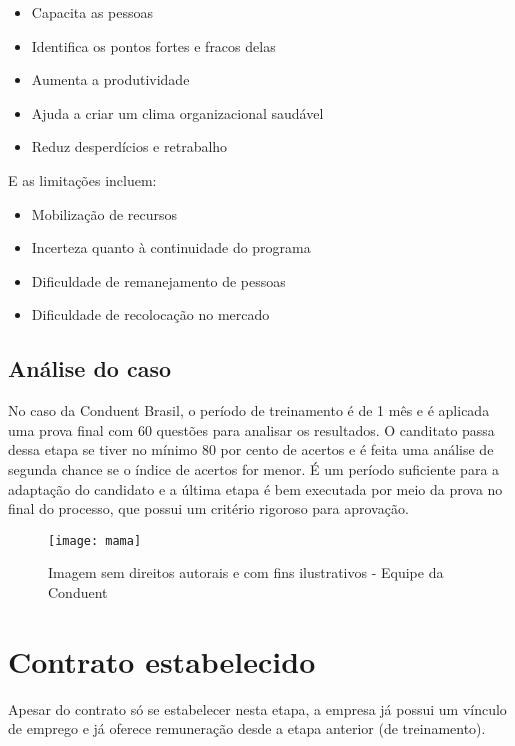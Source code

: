 \documentclass[12pt]{article}
\begin{document}
\begin{itemize}

\item Capacita as pessoas
\item Identifica os pontos fortes e fracos delas
\item Aumenta a produtividade
\item Ajuda a criar um clima organizacional saudável
\item Reduz desperdícios e retrabalho

\end{itemize}

E as limitações incluem:

\begin{itemize}

\item Mobilização de recursos
\item Incerteza quanto à continuidade do programa
\item Dificuldade de remanejamento de pessoas
\item Dificuldade de recolocação no mercado

\end{itemize}

\subsection{Análise do caso}

No caso da Conduent Brasil, o período de treinamento é de 1 mês e é aplicada uma prova final com 60 questões para analisar os resultados. O canditato passa dessa etapa se tiver no mínimo 80 por cento de acertos e é feita uma análise de segunda chance se o índice de acertos for menor. É um período suficiente para a adaptação do candidato e a última etapa é bem executada por meio da prova no final do processo, que possui um critério rigoroso para aprovação.

\begin{figure}[h]
	\centering
	\texttt{[image: mama]}
	\caption{Imagem sem direitos autorais e com fins ilustrativos - Equipe da Conduent}
	\label{fig:mesh1}
\end{figure}

\section{Contrato estabelecido}

Apesar do contrato só se estabelecer nesta etapa, a empresa já possui um vínculo de emprego e já oferece remuneração desde a etapa anterior (de treinamento).
\end{document}

